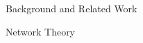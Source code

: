 \documentclass[11pt,twocolumn,a4paper,english]{article}
\newcommand{\TODO}{\textbf{TODO:} }
\begin{document}
\begin{section}{Background and Related Work}
\begin{subsection}{Network Theory}
\end{subsection}


\end{section}


% 	
% 	
% 		
% 	
% 	
% 	
% 	
% 	
% 	
% 	

\end{document}
